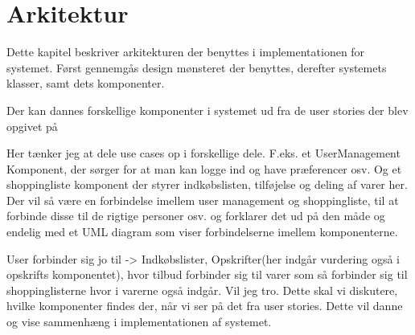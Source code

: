 \section{Arkitektur}
Dette kapitel beskriver arkitekturen der benyttes i implementationen for systemet.
Først gennemgås design mønsteret der benyttes, derefter systemets klasser, samt dets komponenter.







Der kan dannes forskellige komponenter i systemet ud fra de user stories der blev opgivet på 


Her tænker jeg at dele use cases op i forskellige dele.
F.eks. et UserManagement Komponent, der sørger for at man kan logge ind og have præferencer osv.
Og et shoppingliste komponent der styrer indkøbslisten, tilføjelse og deling af varer her. Der vil så være en forbindelse imellem user management og shoppingliste, til at forbinde disse til de rigtige personer osv. og forklarer det ud på den måde og endelig med et UML diagram som viser forbindelserne imellem komponenterne.

User forbinder sig jo til -> Indkøbslister, Opskrifter(her indgår vurdering også i opskrifts komponentet), hvor tilbud forbinder sig til varer som så forbinder sig til shoppinglisterne hvor i varerne også indgår. Vil jeg tro. Dette skal vi diskutere, hvilke komponenter findes der, når vi ser på det fra user stories. Dette vil danne og vise sammenhæng i implementationen af systemet.